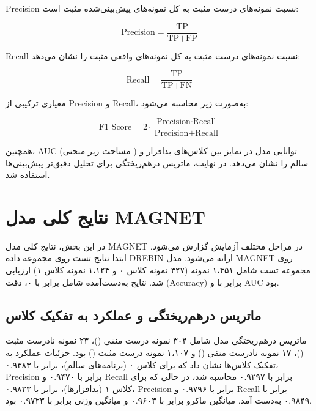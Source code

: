 Precision نسبت نمونه‌های درست مثبت به کل نمونه‌های پیش‌بینی‌شده مثبت است:

\begin{equation}
\text{Precision} = \frac{\text{TP}}{\text{TP} + \text{FP}}
\end{equation}

Recall نسبت نمونه‌های درست مثبت به کل نمونه‌های واقعی مثبت را نشان می‌دهد:

\begin{equation}
\text{Recall} = \frac{\text{TP}}{\text{TP} + \text{FN}}
\end{equation}

 معیاری ترکیبی از Precision و Recall، به‌صورت زیر محاسبه می‌شود:

\begin{equation}
\text{F1 Score} = 2 \cdot \frac{\text{Precision} \cdot \text{Recall}}{\text{Precision} + \text{Recall}}
\end{equation}

همچنین، AUC (مساحت زیر منحنی ) توانایی مدل در تمایز بین کلاس‌های بدافزار و سالم را نشان می‌دهد. در نهایت، ماتریس درهم‌ریختگی  برای تحلیل دقیق‌تر پیش‌بینی‌ها استفاده شد.

\section{نتایج کلی مدل MAGNET}
در این بخش، نتایج کلی مدل MAGNET در مراحل مختلف آزمایش گزارش می‌شود. ابتدا نتایج تست روی مجموعه داده DREBIN \cite{Drebin} ارائه می‌شود. مدل MAGNET روی مجموعه تست شامل ۱،۴۵۱ نمونه (۳۲۷ نمونه کلاس ۰ و ۱،۱۲۴ نمونه کلاس ۱) ارزیابی شد. نتایج به‌دست‌آمده شامل  برابر با ۰، دقت (Accuracy) برابر با  و AUC  بود.

\subsection{ماتریس درهم‌ریختگی و عملکرد به تفکیک کلاس}
ماتریس درهم‌ریختگی مدل شامل ۳۰۴ نمونه درست منفی ()، ۲۳ نمونه نادرست مثبت ()، ۱۷ نمونه نادرست منفی () و ۱،۱۰۷ نمونه درست مثبت () بود. جزئیات عملکرد به تفکیک کلاس‌ها نشان داد که برای کلاس ۰ (برنامه‌های سالم)،  برابر با ۰.۹۳۸۳، Precision برابر با ۰.۹۴۷۰ و Recall برابر با ۰.۹۲۹۷ محاسبه شد، در حالی که برای کلاس ۱ (بدافزارها)،  برابر با ۰.۹۸۲۳، Precision برابر با ۰.۹۷۹۶ و Recall برابر با ۰.۹۸۴۹ به‌دست آمد. میانگین ماکرو  برابر با ۰.۹۶۰۳ و میانگین وزنی  برابر با ۰.۹۷۲۳ بود.

